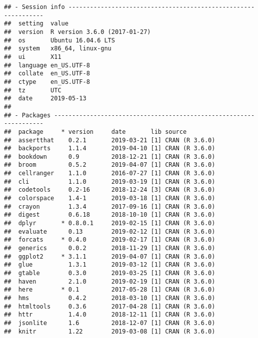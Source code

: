 \documentclass[]{book}
\begin{document}
\begin{verbatim}
## - Session info ---------------------------------------------------------------
##  setting  value                       
##  version  R version 3.6.0 (2017-01-27)
##  os       Ubuntu 16.04.6 LTS          
##  system   x86_64, linux-gnu           
##  ui       X11                         
##  language en_US.UTF-8                 
##  collate  en_US.UTF-8                 
##  ctype    en_US.UTF-8                 
##  tz       UTC                         
##  date     2019-05-13                  
## 
## - Packages -------------------------------------------------------------------
##  package     * version     date       lib source                           
##  assertthat    0.2.1       2019-03-21 [1] CRAN (R 3.6.0)                   
##  backports     1.1.4       2019-04-10 [1] CRAN (R 3.6.0)                   
##  bookdown      0.9         2018-12-21 [1] CRAN (R 3.6.0)                   
##  broom         0.5.2       2019-04-07 [1] CRAN (R 3.6.0)                   
##  cellranger    1.1.0       2016-07-27 [1] CRAN (R 3.6.0)                   
##  cli           1.1.0       2019-03-19 [1] CRAN (R 3.6.0)                   
##  codetools     0.2-16      2018-12-24 [3] CRAN (R 3.6.0)                   
##  colorspace    1.4-1       2019-03-18 [1] CRAN (R 3.6.0)                   
##  crayon        1.3.4       2017-09-16 [1] CRAN (R 3.6.0)                   
##  digest        0.6.18      2018-10-10 [1] CRAN (R 3.6.0)                   
##  dplyr       * 0.8.0.1     2019-02-15 [1] CRAN (R 3.6.0)                   
##  evaluate      0.13        2019-02-12 [1] CRAN (R 3.6.0)                   
##  forcats     * 0.4.0       2019-02-17 [1] CRAN (R 3.6.0)                   
##  generics      0.0.2       2018-11-29 [1] CRAN (R 3.6.0)                   
##  ggplot2     * 3.1.1       2019-04-07 [1] CRAN (R 3.6.0)                   
##  glue          1.3.1       2019-03-12 [1] CRAN (R 3.6.0)                   
##  gtable        0.3.0       2019-03-25 [1] CRAN (R 3.6.0)                   
##  haven         2.1.0       2019-02-19 [1] CRAN (R 3.6.0)                   
##  here        * 0.1         2017-05-28 [1] CRAN (R 3.6.0)                   
##  hms           0.4.2       2018-03-10 [1] CRAN (R 3.6.0)                   
##  htmltools     0.3.6       2017-04-28 [1] CRAN (R 3.6.0)                   
##  httr          1.4.0       2018-12-11 [1] CRAN (R 3.6.0)                   
##  jsonlite      1.6         2018-12-07 [1] CRAN (R 3.6.0)                   
##  knitr         1.22        2019-03-08 [1] CRAN (R 3.6.0)                   

\end{verbatim}
\end{document}
